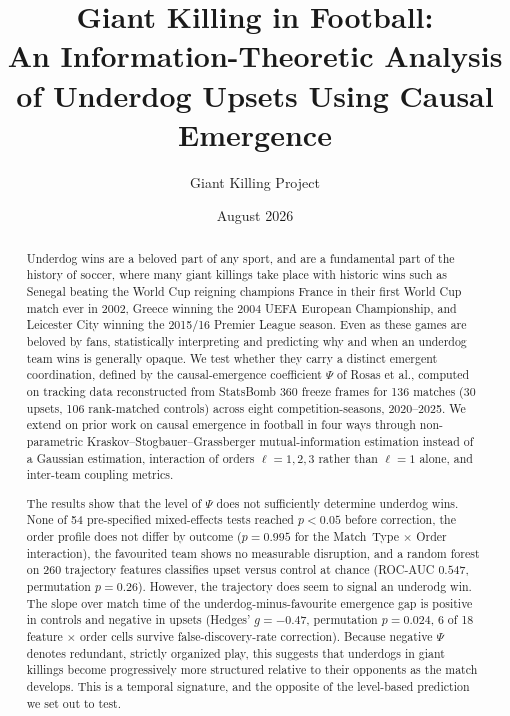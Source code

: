 \documentclass[11pt,a4paper]{article}
\title{\textbf{Giant Killing in Football:\\ An Information-Theoretic Analysis of
Underdog Upsets Using Causal Emergence}}
\author{Giant Killing Project}
\date{August 2026}
\begin{document}
\maketitle

\begin{abstract}
\noindent
Underdog wins are a beloved part of any sport, and are a fundamental part of the history of soccer, where many giant killings take place with historic wins such as Senegal beating the World Cup reigning champions France in their first World Cup match ever in 2002, Greece winning the 2004 UEFA European Championship, and Leicester City winning the 2015/16 Premier League season.
  Even as these games are beloved by fans, statistically interpreting and predicting why and when an underdog team wins is generally opaque. 
  We test whether they carry a distinct emergent
coordination, defined by the causal-emergence coefficient $\Psi$ of Rosas
et al., 
  computed on tracking data reconstructed from StatsBomb 360 freeze frames for
136 matches (30 upsets, 106 rank-matched controls) across eight competition-seasons,
2020--2025. We extend on prior work on causal emergence in football in four ways through
non-parametric Kraskov--Stogbauer--Grassberger mutual-information estimation instead
of a Gaussian estimation, interaction of orders $\ell=1,2,3$ rather than $\ell=1$ alone, and
inter-team coupling metrics.

The results show that the level of $\Psi$ does not sufficiently determine underdog wins.
None of 54 pre-specified mixed-effects tests reached $p<0.05$ before correction, the
order profile does not differ by outcome ($p=0.995$ for the Match~Type $\times$ Order
interaction), the favourited team shows no measurable disruption, and a random forest on 260
trajectory features classifies upset versus control at chance (ROC-AUC $0.547$,
permutation $p=0.26$). However, the trajectory does seem to signal an underodg win.
  The slope over match
time of the underdog-minus-favourite emergence gap is positive in controls and negative
in upsets (Hedges' $g=-0.47$, permutation $p=0.024$, 6 of 18 feature $\times$ order cells
survive false-discovery-rate correction). Because negative $\Psi$ denotes
redundant, strictly organized play, this suggests that underdogs in giant killings become
progressively more structured relative to their opponents as the match develops.
  This is a temporal signature, and the opposite of the level-based prediction we set out to
test. 


\end{abstract}
\end{document}
